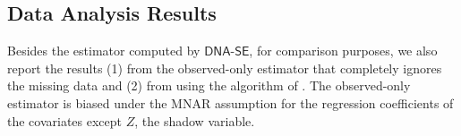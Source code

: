 \documentclass{article}
\def\dnase{{\mathsf{DNA\mbox{-}SE}}}
\theoremstyle{plain}
\theoremstyle{definition}
\theoremstyle{remark}
\begin{document}
\subsection{Data Analysis Results}

Besides the estimator computed by $\dnase$, for comparison purposes, we also report the results (1) from the observed-only estimator that completely ignores the missing data and (2) from \citet{zhao2022versatile} using the algorithm of \citet{atkinson1967numerical}. The observed-only estimator is biased under the MNAR assumption for the regression coefficients of the covariates except $Z$, the shadow variable.
\end{document}
